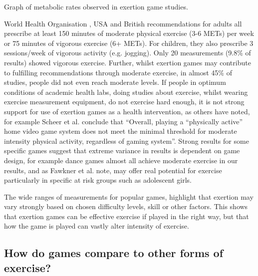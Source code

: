 \begin{table}
\setlength{\abovecaptionskip}{0pt}
\vspace{-4mm}
\caption{Graph of metabolic rates observed in exertion game studies.}

\label{tab:METs}
\end{table}

World Health Organisation \cite{world2010global}, USA \cite{usguidelines2018} and \cite{ukguidelines2011} British recommendations for adults all prescribe at least 150 minutes of moderate physical exercise (3-6 METs) per week or 75 minutes of vigorous exercise (6+ METs). For children, they also prescribe 3 sessions/week of vigorous activity (e.g. jogging). Only 20 measurements (9.8\% of results) showed vigorous exercise. Further, whilst exertion games may contribute to fulfilling recommendations through moderate exercise, in almost 45\% of studies, people did not even reach moderate levels. If people in optimum conditions of academic health labs, doing studies about exercise, whilst wearing exercise measurement equipment, do not exercise hard enough, it is not strong support for use of exertion games as a health intervention, as others have noted, for example Scheer et al. conclude that \enquote{Overall, playing a “physically active” home video game system does not meet the minimal threshold for moderate intensity physical activity, regardless of gaming system\cite{scheer2014wii}}. Strong results for some specific games suggest that extreme variance in results is dependent on game design, for example dance games almost all achieve moderate exercise in our results, and as Fawkner et al. \cite{Fawkner2010AdolescentGaming} note, may offer real potential for exercise particularly in specific at risk groups such as adolescent girls. 

The wide ranges of measurements for popular games, highlight that exertion may vary strongly based on chosen difficulty levels, skill or other factors. This shows that exertion games can be effective exercise if played in the right way, but that how the game is played can vastly alter intensity of exercise.


\subsection{How do games compare to other forms of exercise?}

